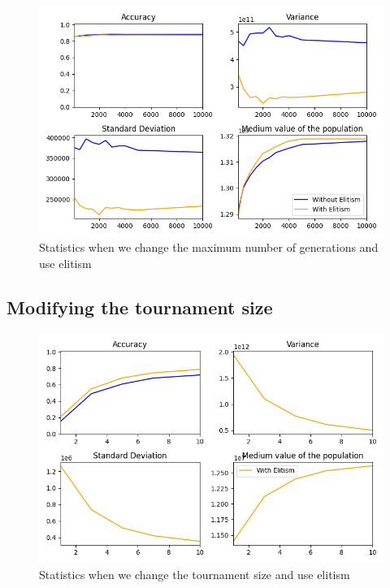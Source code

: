 \documentclass{article}
\begin{document}
    \begin{figure}[H]

        \centering
        \includegraphics[width=1\textwidth]{../media/ej1/02.MaxGenerations_withElitism_behaviour.png}
        \caption{Statistics when we change the maximum number of generations and use elitism}
        \label{Statistics when we change the maximum number of generations and use elitism}

    \end{figure}

    
    \subsection*{Modifying the tournament size}

    \begin{figure}[H]

        \centering
        \includegraphics[width=1\textwidth]{../media/ej1/03.TournamentSize_withElitism_behaviour.png}
        \caption{Statistics when we change the tournament size and use elitism}
        \label{Statistics when we change the tournament size and use elitism}

    \end{figure}
\end{document}
